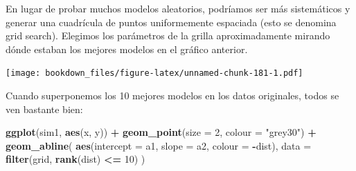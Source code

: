 \documentclass[]{book}
\newenvironment{Shaded}{\begin{snugshade}}{\end{snugshade}}
\newcommand{\DataTypeTok}[1]{\textcolor[rgb]{0.13,0.29,0.53}{#1}}
\newcommand{\DecValTok}[1]{\textcolor[rgb]{0.00,0.00,0.81}{#1}}
\newcommand{\KeywordTok}[1]{\textcolor[rgb]{0.13,0.29,0.53}{\textbf{#1}}}
\newcommand{\NormalTok}[1]{#1}
\newcommand{\OperatorTok}[1]{\textcolor[rgb]{0.81,0.36,0.00}{\textbf{#1}}}
\newcommand{\StringTok}[1]{\textcolor[rgb]{0.31,0.60,0.02}{#1}}
\begin{document}
En lugar de probar muchos modelos aleatorios, podríamos ser más sistemáticos y generar una cuadrícula de puntos uniformemente espaciada (esto se denomina grid search). Elegimos los parámetros de la grilla aproximadamente mirando dónde estaban los mejores modelos en el gráfico anterior.

\begin{Shaded}
\end{Shaded}

\texttt{[image: bookdown\_files/figure-latex/unnamed-chunk-181-1.pdf]}

Cuando superponemos los 10 mejores modelos en los datos originales, todos se ven bastante bien:

\begin{Shaded}
\begin{Highlighting}[]
\KeywordTok{ggplot}\NormalTok{(sim1, }\KeywordTok{aes}\NormalTok{(x, y)) }\OperatorTok{+}\StringTok{ }
\StringTok{  }\KeywordTok{geom_point}\NormalTok{(}\DataTypeTok{size =} \DecValTok{2}\NormalTok{, }\DataTypeTok{colour =} \StringTok{"grey30"}\NormalTok{) }\OperatorTok{+}\StringTok{ }
\StringTok{  }\KeywordTok{geom_abline}\NormalTok{(}
    \KeywordTok{aes}\NormalTok{(}\DataTypeTok{intercept =}\NormalTok{ a1, }\DataTypeTok{slope =}\NormalTok{ a2, }\DataTypeTok{colour =} \OperatorTok{-}\NormalTok{dist), }
    \DataTypeTok{data =} \KeywordTok{filter}\NormalTok{(grid, }\KeywordTok{rank}\NormalTok{(dist) }\OperatorTok{<=}\StringTok{ }\DecValTok{10}\NormalTok{)}
\NormalTok{  )}
\end{Highlighting}
\end{Shaded}
\end{document}
